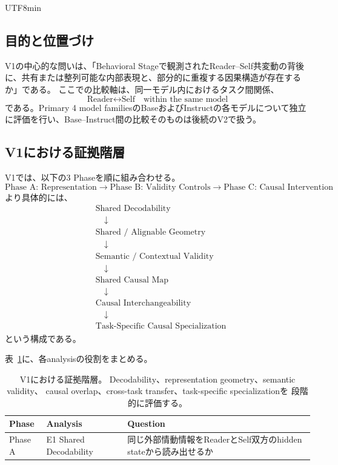 \documentclass{article} %
\begin{document}
\begin{CJK*}{UTF8}{min}
\subsection{目的と位置づけ}

V1の中心的な問いは、「Behavioral Stageで観測されたReader--Self共変動の背後に、共有または整列可能な内部表現と、部分的に重複する因果構造が存在するか」である。
ここでの比較軸は、同一モデル内におけるタスク間関係、
\[
\text{Reader} \leftrightarrow \text{Self} \quad \text{within the same model}
\]
である。Primary 4 model familiesのBaseおよびInstructの各モデルについて独立に評価を行い、Base--Instruct間の比較そのものは後続のV2で扱う。


\subsection{V1における証拠階層}

V1では、以下の3 Phaseを順に組み合わせる。
\[
\text{Phase A: Representation}
\rightarrow
\text{Phase B: Validity Controls}
\rightarrow
\text{Phase C: Causal Intervention}
\]
より具体的には、
\[
\begin{aligned}
&\text{Shared Decodability}\\
&\quad\downarrow\\
&\text{Shared / Alignable Geometry}\\
&\quad\downarrow\\
&\text{Semantic / Contextual Validity}\\
&\quad\downarrow\\
&\text{Shared Causal Map}\\
&\quad\downarrow\\
&\text{Causal Interchangeability}\\
&\quad\downarrow\\
&\text{Task-Specific Causal Specialization}
\end{aligned}
\]
という構成である。

表~\ref{tab:v1-evidence-hierarchy}に、各analysisの役割をまとめる。

\begin{table}[htbp]
\centering
\small
\caption{V1における証拠階層。
Decodability、representation geometry、semantic validity、
causal overlap、cross-task transfer、task-specific specializationを
段階的に評価する。}
\label{tab:v1-evidence-hierarchy}
\begin{tabularx}{\linewidth}{
@{}
>{\raggedright\arraybackslash}p{1.6cm}
>{\raggedright\arraybackslash}p{3.0cm}
>{\raggedright\arraybackslash}X
@{}
}
\toprule
\textbf{Phase} &
\textbf{Analysis} &
\textbf{Question} \\
\midrule
Phase A &
E1 Shared Decodability &
同じ外部情動情報をReaderとSelf双方のhidden stateから読み出せるか \\


\end{tabularx}
\end{table}
\end{CJK*}
\end{document}
